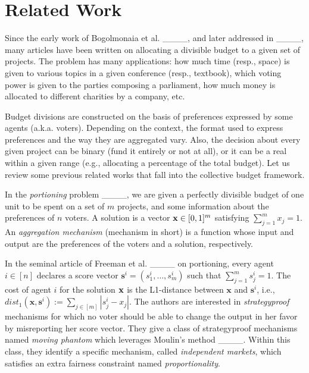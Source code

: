 \section{Related Work}
Since the early work of Bogolmonaia et al. ____, and later addressed in ____, many articles have been written on allocating a divisible budget to a given set of projects. The problem has many applications: how much time (resp., space) 
is given to various topics in a given conference (resp., textbook),  which voting power is given to the parties composing a parliament, how much money is allocated to different charities by a company, etc.     


Budget divisions are constructed on the basis of preferences expressed by some agents (a.k.a. voters). Depending on the context, the format used to express preferences and the way they are aggregated vary. Also, the decision about every given project can be binary (fund it entirely or not at all), or it can be a real %
within a given range (e.g., allocating a percentage of the total budget).     
Let us review some previous related works that fall into the collective budget framework.   



In the \emph{portioning} problem ____, we are given a perfectly divisible budget of one unit to be spent on a set of $m$ projects, and some information about the preferences of $n$ voters. A solution is a vector ${\bf x} \in [0,1]^m$ satisfying $\sum_{j=1}^m x_j=1$. An \emph{aggregation mechanism} (mechanism in short) is a function whose input and output are the preferences of the voters and a solution, respectively.



In the seminal article of Freeman et al. ____ on portioning, every agent $i \in [n]$ declares a score vector $\textbf{s}^i=(s^i_1, \ldots,s^i_m)$ such that $\sum_{j=1}^m s^i_j=1$. The cost of agent $i$ for the solution ${\bf x}$  is the L1-distance between $\textbf{x}$ and $\textbf{s}^i$, i.e.,  $dist_1(\textbf{x},\textbf{s}^i):=\sum_{j \in [m]} |s^i_j - x_j|$. The authors are interested in \emph{strategyproof} mechanisms for which no voter  should be able to change the output in her favor by misreporting her score vector. They give a class of strategyproof mechanisms named \emph{moving phantom} which leverages Moulin's method ____. Within this class, they identify a specific mechanism, called \emph{independent markets}, which satisfies an extra fairness constraint named \emph{proportionality}.         



